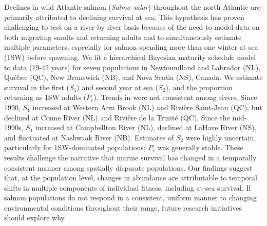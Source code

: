 \documentclass[12pt]{article}
\newcommand{\So}{$S_{1}$\xspace}
\newcommand{\St}{$S_{2}$\xspace}
\newcommand{\Pg}{$P_r$\xspace}
\begin{document}
Declines in wild Atlantic salmon (\emph{Salmo salar}) throughout the north
Atlantic are primarily attributed to declining survival at sea. This
hypothesis has proven challenging to test on a river-by-river basis because of
the need to model data on both migrating smolts and returning adults and to
simultaneously estimate multiple parameters, especially for salmon spending
more than one winter at sea (1SW) before spawning. We fit a hierarchical Bayesian
maturity schedule model to data (19-42 years) for seven populations in  
Newfoundland and Labrador (NL), Qu\'{e}bec (QC), New Brunswick (NB), and Nova
Scotia (NS), Canada. We estimate survival in the first (\So) and second year at sea (\St),
and the proportion returning as 1SW adults (\Pg). Trends in  were not consistent
among rivers. Since 1990, \So increased at Western Arm Brook (NL)
and Rivi\`{e}re Saint-Jean (QC), but declined at Conne River (NL) and Rivière
de la Trinité (QC). Since the mid-1990s, \So increased at Campbellton River (NL),
declined at LaHave River (NS), and fluctuated at Nashwaak
River (NB). Estimates of \St were highly uncertain, particularly for
1SW-dominated populations; \Pg was generally stable. These results challenge the
narrative that marine survival has changed in a temporally consistent manner
among spatially disparate populations. Our findings suggest that, at the
population level, changes in abundance are attributable to temporal shifts in
multiple components of individual fitness, including at-sea survival. If
salmon populations do not respond in a consistent, uniform manner to changing
environmental conditions throughout their range, future research initiatives
should explore why.
\end{document}
